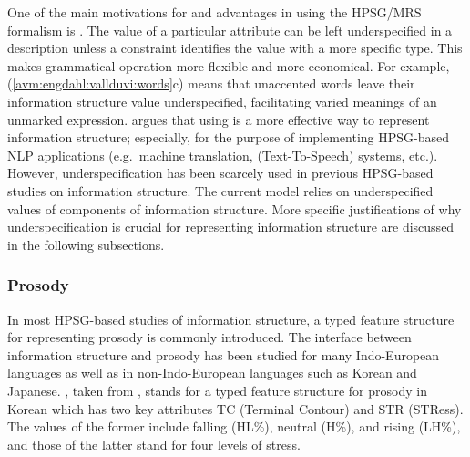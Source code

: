 One of the main motivations for and advantages in using the HPSG/MRS
formalism is .  The value of a particular
attribute can be left underspecified in a description unless a
constraint identifies the value with a more specific type.  This makes
grammatical operation more flexible and more economical. For example,
(\ref{avm:engdahl:vallduvi:words}c) means that unaccented words leave
their information structure value underspecified, facilitating varied
meanings of an unmarked expression. \citet{kuhn:96} argues
that using  is a more effective way to represent
information structure; especially, for the purpose of implementing
HPSG-based NLP applications (e.g.\ machine translation, 
(Text-To-Speech) systems, etc.).  However, underspecification has been
scarcely used in previous HPSG-based studies on information structure.
The current model relies on underspecified values of components of
information structure.  More specific justifications of why
underspecification is crucial for representing information structure
are discussed in the following subsections.


\subsubsection{Prosody}
\label{8:ssec:hpsg:prosody}

In most HPSG-based studies of information structure, a typed feature
structure for representing prosody is commonly introduced.
The interface between information structure and prosody has been
studied for many Indo-European languages as well as in
non-Indo-European languages such as Korean and Japanese.
, taken from \citet{chang:02}, stands for a
typed feature structure for prosody in Korean which has two key
attributes TC (Terminal Contour) and STR (STRess). The values of the
former include falling (HL\%), neutral (H\%), and rising (LH\%), and
those of the latter stand for four levels of stress.




